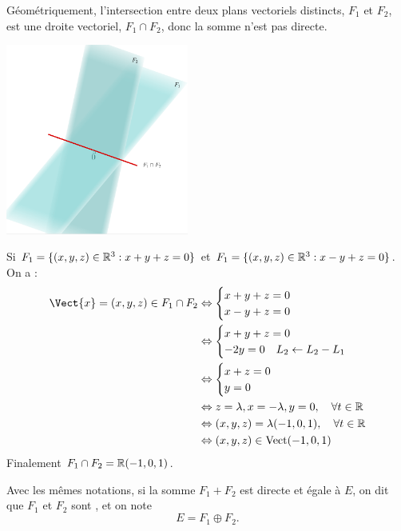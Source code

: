 \documentclass{book}
\begin{document}
\begin{Exemple} Géométriquement, l'intersection entre deux plans vectoriels distincts, $F_1$ et $F_2$, est une droite vectoriel, $F_1\cap F_2$, donc la somme n'est pas directe.
\begin{center}
\includegraphics[width=6cm]{espace_vectoriel_inter.png}
\end{center}
Si $F_1=\{(x,y,z)\in\mathbb{R}^3: x+y+z=0\}$ et $F_1=\{(x,y,z)\in\mathbb{R}^3: x-y+z=0\}$. On a :
$$\begin{aligned}
 \Vect{x}=(x,y,z)\in F_1 \cap F_2 & \Leftrightarrow \begin{cases}x+y+z=0 \\ x-y+z=0 \end{cases}\\
 & \Leftrightarrow \begin{cases}x+y+z=0 \\ -2y=0 \quad L_2\leftarrow L_2 - L_1\end{cases}\\
 & \Leftrightarrow \begin{cases}x+z=0 \\ y=0 \end{cases}\\
 & \Leftrightarrow  z=\lambda, x=-\lambda , y=0,\quad  \forall t\in \R \\
 & \Leftrightarrow  (x,y,z) = \lambda(-1,0,1),\quad  \forall t\in \R \\
 & \Leftrightarrow  (x,y,z) \in \Vectt( -1,0,1)
 \end{aligned}$$
Finalement  $F_1 \cap F_2 = \mathbb{R}  ( -1,0,1)$. 
\end{Exemple}
\begin{Definition}[Supplémentaires]
Avec les mêmes notations, si la somme $F_1+F_2$ est directe et égale à $E$,
on dit que $F_1$ et $F_2$ sont , et on note
\[ E = F_1\oplus F_2. \]
\end{Definition}
\end{document}
